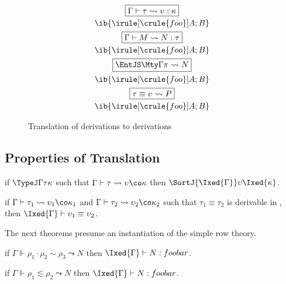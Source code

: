 \documentclass[authoryear,acmsmall,screen]{acmart}
\begin{document}
\begin{figure}[H]
\small
\begin{gather*}
\fbox{$\Gamma \vdash \tau \leadsto \upsilon : \kappa$}
\\
\ib{\irule[\crule{foo}]{A};{B}} \\
\fbox{$\Gamma \vdash M \leadsto N : \tau$}
\\
\ib{\irule[\crule{foo}]{A};{B}} \\
\fbox{${\EntJ \Gamma \pi} \leadsto N$}
\\
\ib{\irule[\crule{foo}]{A};{B}}  \\
\fbox{${\tau \equiv \upsilon} \leadsto P$}
\\
\ib{\irule[\crule{foo}]{A};{B}} 
\end{gather*}
\caption{Translation of \RO derivations to \IX{} derivations}
\end{figure}

\subsection{Properties of Translation}

\begin{theorem}
  if $\TypeJ \Gamma \tau \kappa$ such that $\Gamma \vdash \tau \leadsto \upsilon \co \kappa$ then $\SortJ {\Ixed{\Gamma}} \upsilon {\Ixed{\kappa}}$.
\end{theorem}

\begin{theorem}
  if $\Gamma \vdash \tau_{1} \leadsto \upsilon_{1} \co \kappa_{1}$ and $\Gamma \vdash \tau_{2} \leadsto \upsilon_{2} \co \kappa_{2}$ such that $\tau_{1} \equiv \tau_{2}$ is derivable in \RO, then $\Ixed{\Gamma} \vdash \upsilon_{1} \equiv \upsilon_{2}$.
\end{theorem}

The next theorems presume an \RO instantiation of the simple row theory.

\begin{theorem}
  if $\Gamma \Vdash \rho_{1} \cdot \rho_{2} \sim \rho_{3} \leadsto N$ then $\Ixed{\Gamma} \vdash N : foobar$.
\end{theorem}

\begin{theorem}
  if $\Gamma \Vdash \rho_{1} \lesssim \rho_{2} \leadsto N$ then $\Ixed{\Gamma} \vdash N : foobar$.
\end{theorem}
\end{document}
